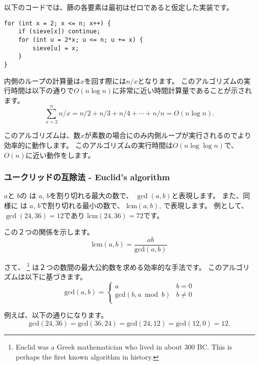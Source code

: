 以下のコードでは、篩の各要素は最初はゼロであると仮定した実装です。

\begin{lstlisting}
for (int x = 2; x <= n; x++) {
    if (sieve[x]) continue;
    for (int u = 2*x; u <= n; u += x) {
        sieve[u] = x;
    }
}
\end{lstlisting}

内側のループの計算量は$x$を回す際には$n/x$となります。
このアルゴリズムの実行時間は以下の通りで$ O(n \log n)$に非常に近い時間計算量であることが示されます。
\[\sum_{x=2}^n n/x = n/2 + n/3 + n/4 + \cdots + n/n = O(n \log n).\]


このアルゴリズムは、数$x$が素数の場合にのみ内側ループが実行されるのでより効率的に動作します。
このアルゴリズムの実行時間は$O(n \log \log n)$で、$O(n)$に近い動作をします。

\subsubsection{ユークリッドの互除法 - Euclid's algorithm}



$a$と $b$の
は
$a$, $b$を割り切れる最大の数で、
 $\gcd(a,b)$と表現します。
 また、同様に
 は
$a$, $b$で割り切れる最小の数で、
 $\textrm{lcm}(a,b)$,
で表現します。
例として、
$\gcd(24,36)=12$であり
$\textrm{lcm}(24,36)=72$です。

この２つの関係を示します。
\[\textrm{lcm}(a,b)=\frac{ab}{\textrm{gcd}(a,b)}\]

さて、
\footnote{Euclid was a Greek mathematician who
lived in about 300 BC. This is perhaps the first known algorithm in history.}
は２つの数間の最大公約数を求める効率的な手法です。
このアルゴリズムは以下に基づきます。
\begin{equation*}
    \textrm{gcd}(a,b) = \begin{cases}
               a        & b = 0\\
               \textrm{gcd}(b,a \bmod b) & b \neq 0\\
           \end{cases}
\end{equation*}

例えば、以下の通りになります。
\[\textrm{gcd}(24,36) = \textrm{gcd}(36,24)
= \textrm{gcd}(24,12) = \textrm{gcd}(12,0)=12.\]

